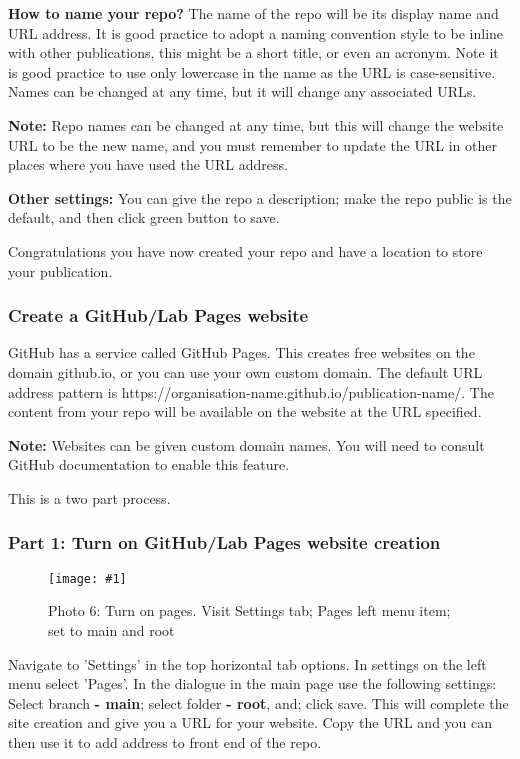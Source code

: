 \documentclass{article}
\newlength{\imgwidth}
\newcommand\scaledgraphics[2]{%
                
\settowidth{\imgwidth}{\texttt{[image: \#1]}}%
                
\setlength{\imgwidth}{\minof{\imgwidth}{#2\textwidth}}%
                
\texttt{[image: \#1]}%
                
}
\begin{document}
\textbf{How to name your repo?} The name of the repo will be its display name and URL address. It is good practice to adopt a naming convention style to be inline with other publications, this might be a short title, or even an acronym. Note it is good practice to use only lowercase in the name as the URL is case-sensitive. Names can be changed at any time, but it will change any associated URLs.


\textbf{Note:} Repo names can be changed at any time, but this will change the website URL to be the new name, and you must remember to update the URL in other places where you have used the URL address. 


\textbf{Other settings:} You can give the repo a description; make the repo public is the default, and then click green button to save.


Congratulations you have now created your repo and have a location to store your publication.


\subsubsection{Create a GitHub/Lab Pages website}\label{H9225084}



GitHub has a service called GitHub Pages. This creates free websites on the domain github.io, or you can use your own custom domain. The default URL address pattern is https://organisation-name.github.io/publication-name/. The content from your repo will be available on the website at the URL specified. 


\textbf{Note:} Websites can be given custom domain names. You will need to consult GitHub documentation to enable this feature.


This is a two part process.


\subsubsection{Part 1: Turn on GitHub/Lab Pages website creation}\label{H383599}


\begin{figure}
\scaledgraphics{3e552a2e-0e2d-44ee-94bc-1cbf5b95f7f5.png}{1}
\caption*{Photo 6: Turn on pages. Visit Settings tab; Pages left menu item; set to main and root}\label{F62609231}
\end{figure}


Navigate to 'Settings' in the top horizontal tab options. In settings on the left menu select 'Pages'. In the dialogue in the main page use the following settings: Select branch \textbf{- main}; select folder \textbf{- root}, and; click save. This will complete the site creation and give you a URL for your website. Copy the URL and you can then use it to add address to front end of the repo.
\end{document}
